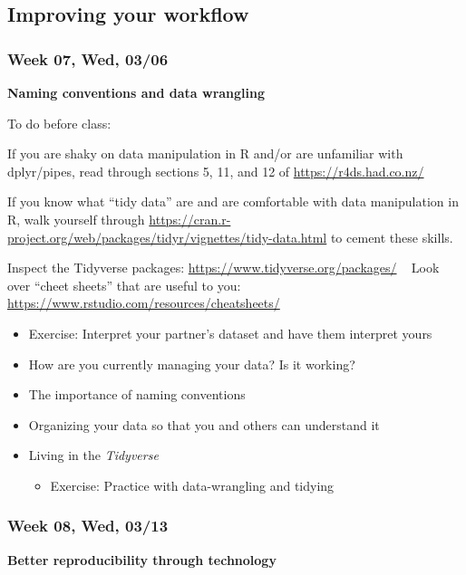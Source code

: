 \documentclass[11pt,man]{article}
\providecommand{\tightlist}{%
  \setlength{\itemsep}{0pt}\setlength{\parskip}{0pt}}
\begin{document}
\subsection{Improving your workflow}\label{improving-your-workflow}

\subsubsection{Week 07, Wed, 03/06}\label{week-07-wed-0306}

\textbf{Naming conventions and data wrangling}

To do before class:

If you are shaky on data manipulation in R and/or are unfamiliar with
dplyr/pipes, read through sections 5, 11, and 12 of
\url{https://r4ds.had.co.nz/}

If you know what ``tidy data'' are and are comfortable with data
manipulation in R, walk yourself through
\url{https://cran.r-project.org/web/packages/tidyr/vignettes/tidy-data.html}
to cement these skills.

Inspect the Tidyverse packages:
\url{https://www.tidyverse.org/packages/} ~ Look over ``cheet sheets''
that are useful to you:
\url{https://www.rstudio.com/resources/cheatsheets/} ~

\begin{itemize}
\tightlist
\item
  Exercise: Interpret your partner's dataset and have them interpret
  yours
\item
  How are you currently managing your data? Is it working?
\item
  The importance of naming conventions
\item
  Organizing your data so that you and others can understand it
\item
  Living in the \emph{Tidyverse}

  \begin{itemize}
  \tightlist
  \item
    Exercise: Practice with data-wrangling and tidying
  \end{itemize}
\end{itemize}

\subsubsection{Week 08, Wed, 03/13}\label{week-08-wed-0313}

\textbf{Better reproducibility through technology}
\end{document}
